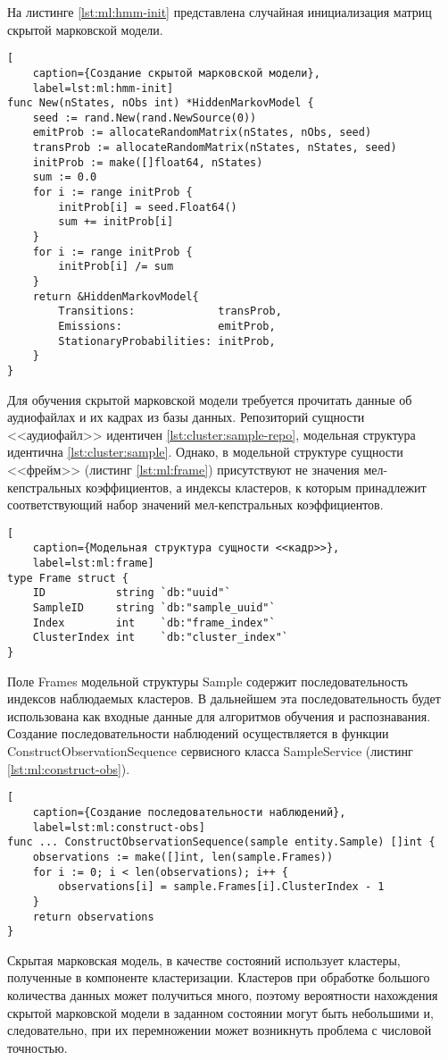 На листинге \ref{lst:ml:hmm-init} представлена случайная инициализация матриц скрытой марковской модели.
\begin{lstlisting}[
	caption={Создание скрытой марковской модели},
	label=lst:ml:hmm-init]
func New(nStates, nObs int) *HiddenMarkovModel {
    seed := rand.New(rand.NewSource(0))
    emitProb := allocateRandomMatrix(nStates, nObs, seed)
    transProb := allocateRandomMatrix(nStates, nStates, seed)
    initProb := make([]float64, nStates)
    sum := 0.0
    for i := range initProb {
        initProb[i] = seed.Float64()
        sum += initProb[i]
    }
    for i := range initProb {
        initProb[i] /= sum
    }
    return &HiddenMarkovModel{
        Transitions:             transProb,
        Emissions:               emitProb,
        StationaryProbabilities: initProb,
    }
}
\end{lstlisting}


Для обучения скрытой марковской модели требуется прочитать данные об аудиофайлах и их кадрах из базы данных. Репозиторий сущности <<аудиофайл>> идентичен \ref{lst:cluster:sample-repo}, модельная структура идентична \ref{lst:cluster:sample}. Однако, в модельной структуре сущности <<фрейм>> (листинг \ref{lst:ml:frame}) присутствуют не значения мел-кепстральных коэффициентов, а индексы кластеров, к которым принадлежит соответствующий набор значений мел-кепстральных коэффициентов. 
\begin{lstlisting}[
	caption={Модельная структура сущности <<кадр>>},
	label=lst:ml:frame]
type Frame struct {
	ID           string `db:"uuid"`
	SampleID     string `db:"sample_uuid"`
	Index        int    `db:"frame_index"`
	ClusterIndex int    `db:"cluster_index"`
}
\end{lstlisting}
Поле Frames модельной структуры Sample содержит последовательность индексов наблюдаемых кластеров. В дальнейшем эта последовательность будет использована как входные данные для алгоритмов обучения и распознавания. Создание последовательности наблюдений осуществляется в функции ConstructObservationSequence сервисного класса SampleService (листинг \ref{lst:ml:construct-obs}).

\begin{lstlisting}[
	caption={Создание последовательности наблюдений},
	label=lst:ml:construct-obs]
func ... ConstructObservationSequence(sample entity.Sample) []int {
	observations := make([]int, len(sample.Frames))
	for i := 0; i < len(observations); i++ {
		observations[i] = sample.Frames[i].ClusterIndex - 1
	}
	return observations
}
\end{lstlisting}
Скрытая марковская модель, в качестве состояний использует кластеры, полученные в компоненте кластеризации. Кластеров при обработке большого количества данных может получиться много, поэтому вероятности нахождения скрытой марковской модели в заданном состоянии могут быть небольшими и, следовательно, при их перемножении может возникнуть проблема с числовой точностью.

